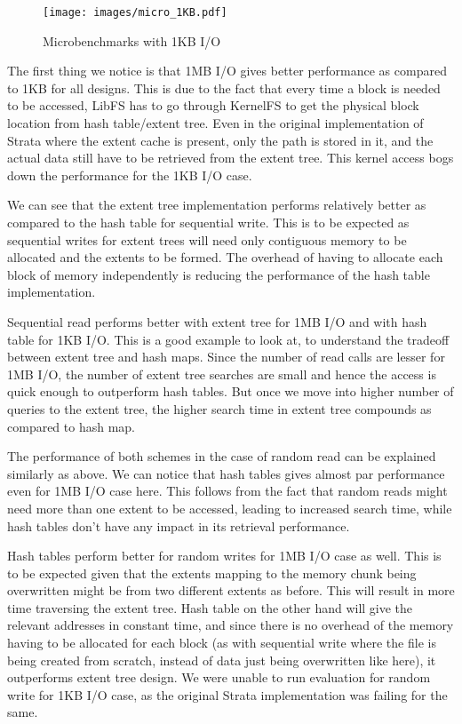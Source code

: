 \documentclass[letterpaper,twocolumn, 11pt]{article}
\begin{document}
\begin{figure}[t]
\centering
\texttt{[image: images/micro\_1KB.pdf]}
\caption{Microbenchmarks with 1KB I/O}
\label{fig:micro_1kb}
\end{figure}

The first thing we notice is that 1MB I/O gives better performance as compared to 1KB for all designs. This is due to the fact that every time a block is needed to be accessed, LibFS has to go through KernelFS to get the physical block location from hash table/extent tree. Even in the original implementation of Strata where the extent cache is present, only the path is stored in it, and the actual data still have to be retrieved from the extent tree. This kernel access bogs down the performance for the 1KB I/O case.

We can see that the extent tree implementation performs relatively better as compared to the hash table for sequential write. This is to be expected as sequential writes for extent trees will need only contiguous memory to be allocated and the extents to be formed. The overhead of having to allocate each block of memory independently is reducing the performance of the hash table implementation.

Sequential read performs better with extent tree for 1MB I/O and with hash table for 1KB I/O. This is a good example to look at, to understand the tradeoff between extent tree and hash maps. Since the number of read calls are lesser for 1MB I/O, the number of extent tree searches are small and hence the access is quick enough to outperform hash tables. But once we move into higher number of queries to the extent tree, the higher search time in extent tree compounds as compared to hash map.

The performance of both schemes in the case of random read can be explained similarly as above. We can notice that hash tables gives almost par performance even for 1MB I/O case here. This follows from the fact that random reads might need more than one extent to be accessed, leading to increased search time, while hash tables don't have any impact in its retrieval performance.

Hash tables perform better for random writes for 1MB I/O case as well. This is to be expected given that the extents mapping to the memory chunk being overwritten might be from two different extents as before. This will result in more time traversing the extent tree. Hash table on the other hand will give the relevant addresses in constant time, and since there is no overhead of the memory having to be allocated for each block (as with sequential write where the file is being created from scratch, instead of data just being overwritten like here), it outperforms extent tree design. We were unable to run evaluation for random write for 1KB I/O case, as the original Strata implementation was failing for the same.
\end{document}
